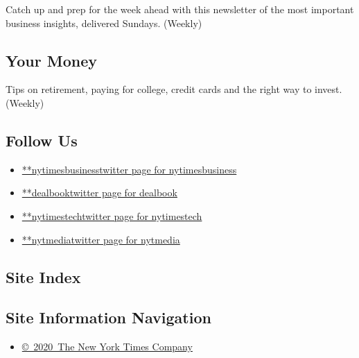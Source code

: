 Catch up and prep for the week ahead with this newsletter of the most
important business insights, delivered Sundays. (Weekly)

\hypertarget{your-money}{%
\subsection{Your Money}\label{your-money}}

Tips on retirement, paying for college, credit cards and the right way
to invest. (Weekly)

\hypertarget{follow-us}{%
\subsection{Follow Us}\label{follow-us}}

\begin{itemize}
\tightlist
\item
  \href{https://twitter.com/nytimesbusiness}{**nytimesbusinesstwitter
  page for nytimesbusiness}
\item
  \href{https://twitter.com/dealbook}{**dealbooktwitter page for
  dealbook}
\item
  \href{https://twitter.com/nytimestech}{**nytimestechtwitter page for
  nytimestech}
\item
  \href{https://twitter.com/nytmedia}{**nytmediatwitter page for
  nytmedia}
\end{itemize}

\hypertarget{site-index}{%
\subsection{Site Index}\label{site-index}}

\hypertarget{site-information-navigation}{%
\subsection{Site Information
Navigation}\label{site-information-navigation}}

\begin{itemize}
\tightlist
\item
  \href{https://help.nytimes3xbfgragh.onion/hc/en-us/articles/115014792127-Copyright-notice}{©~2020~The
  New York Times Company}
\end{itemize}


